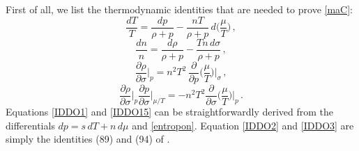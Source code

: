 \documentclass[a4paper, amsfonts, amssymb, amsmath, reprint, showkeys, nofootinbib, twoside, onecolumn,notitlepage]{revtex4-1}
\begin{document}
First of all, we list the thermodynamic identities that are needed to prove \eqref{maC}:
\begin{equation}\label{IDDO1}
\dfrac{d T}{T} = \dfrac{d p}{\rho +p}  - \dfrac{nT}{\rho +p} \, d \bigg( \dfrac{\mu}{T} \bigg) \, , 
\end{equation}
\begin{equation}\label{IDDO15}
\dfrac{dn}{n} = \dfrac{d\rho}{\rho +p} - \dfrac{Tn \, d\sigma}{\rho +p} \, ,
\end{equation}
\begin{equation}\label{IDDO2}
\dfrac{\partial \rho}{\partial \sigma} \bigg|_p = n^2 T^2 \, \dfrac{\partial}{\partial p} \bigg( \dfrac{\mu}{T} \bigg)\bigg|_{\sigma} \, ,
\end{equation}
\begin{equation}\label{IDDO3}
  \dfrac{\partial \rho}{\partial \sigma} \bigg|_p  \dfrac{\partial p}{\partial \sigma}\bigg|_{\mu/T} = -n^2 T^2 \dfrac{\partial}{\partial \sigma}  \bigg( \dfrac{\mu}{T} \bigg)\bigg|_p\, .
\end{equation}
Equations \eqref{IDDO1} and \eqref{IDDO15} can be straightforwardly derived from the differentials $ dp = s\, dT + n \, d\mu$ and \eqref{entropon}.
Equation \eqref{IDDO2} and \eqref{IDDO3} are simply the identities (89) and (94) of \citet{Hishcock1983}.
\end{document}

